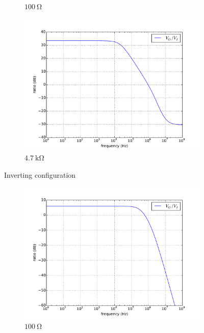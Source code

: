 \documentclass[12pt, a4paper]{article}
\begin{document}
\begin{enumerate}[itemsep=20pt, topsep=10pt]
\begin{figure}[H]
\begin{subfigure}[b]{0.45\textwidth}
      \caption{$\SI{100}\ohm$}
    \end{subfigure}
    \begin{subfigure}[b]{0.45\textwidth}
      \includegraphics[width=1\textwidth]{circuit/p2.pdf}
      \caption{$\SI{4.7}\kohm$}
    \end{subfigure}
    \caption{Inverting configuration}
  \end{figure}
  \begin{figure}[H]
    \centering
    \begin{subfigure}[b]{0.45\textwidth}
      \includegraphics[width=1\textwidth]{circuit/p3.pdf}
      \caption{$\SI{100}\ohm$}
    \end{subfigure}
    \begin{subfigure}[b]{0.45\textwidth}

\end{subfigure}
\end{figure}
\end{enumerate}
\end{document}
